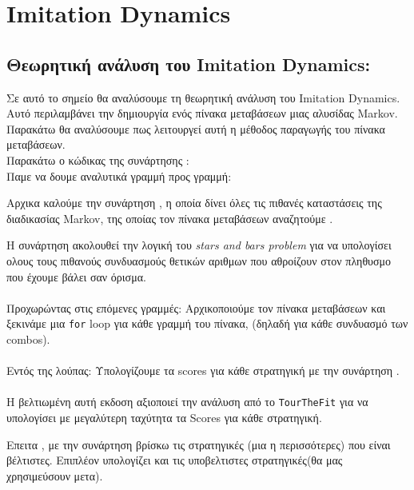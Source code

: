 \chapter{Imitation Dynamics}
	\section{Θεωρητική ανάλυση του Imitation Dynamics:}
	
	Σε αυτό το σημείο θα αναλύσουμε τη θεωρητική ανάλυση του Imitation Dynamics.  Aυτό περιλαμβάνει την δημιουργία ενός πίνακα μεταβάσεων μιας αλυσίδας Markov. Παρακάτω θα αναλύσουμε πως λειτουργεί αυτή η μέθοδος παραγωγής του πίνακα μεταβάσεων.
	\\
	
	Παρακάτω ο κώδικας της συνάρτησης :
	\\

	
	
	\indent Παμε να δουμε αναλυτικά γραμμή προς γραμμή:
	
	Αρχικα καλούμε την συνάρτηση , η οποία δίνει όλες τις πιθανές καταστάσεις της διαδικασίας Markov, της οποίας τον πίνακα μεταβάσεων αναζητούμε .
	\\
	
	

	


	\vspace{1em}
	
	Η συνάρτηση ακολουθεί την λογική του \textit{stars and bars problem} για να υπολογίσει ολους τους πιθανούς συνδυασμούς θετικών αριθμων που αθροίζουν στον πληθυσμο που έχουμε βάλει σαν όρισμα.
	\\
	\\
	Προχωρώντας στις επόμενες γραμμές: Αρχικοποιούμε τον πίνακα μεταβάσεων και ξεκινάμε μια \texttt{for} loop για κάθε γραμμή του πίνακα, (δηλαδή για κάθε συνδυασμό των combos).
	\\
	\\
Εντός της λούπας: Υπολογίζουμε τα scores για κάθε στρατηγική με την συνάρτηση .
\\
\\
	Η βελτιωμένη αυτή εκδοση αξιοποιεί την ανάλυση από το \texttt{TourTheFit} για να υπολογίσει με μεγαλύτερη ταχύτητα τα Scores για κάθε στρατηγική.

	Επειτα , με την συνάρτηση  βρίσκω τις στρατηγικές (μια η περισσότερες) που είναι βέλτιστες. Επιπλέον υπολογίζει και τις υποβελτιστες στρατηγικές(θα μας χρησιμεύσουν μετα).\\
	

